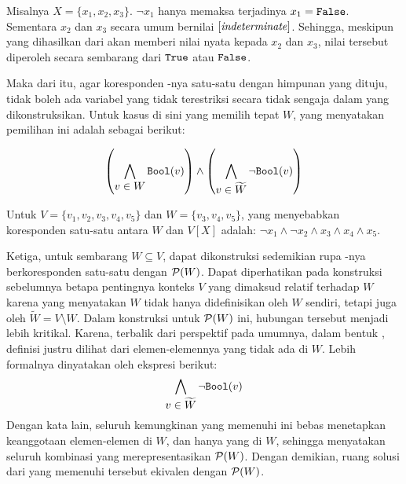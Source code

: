 \begin{example}
	Misalnya \(X = \{x_1, x_2, x_3\}\).  \(\neg x_1\) hanya memaksa terjadinya \(x_1 = \mathtt{False}\). Sementara \(x_2\) dan \(x_3\) secara umum bernilai \(\mathit{[indeterminate]}\). Sehingga, meskipun  yang dihasilkan dari  akan memberi nilai nyata kepada \(x_2\) dan \(x_3\), nilai tersebut diperoleh secara sembarang dari \(\mathtt{True}\) atau \(\mathtt{False}\).
\end{example}

Maka dari itu, agar koresponden -nya satu-satu dengan himpunan yang dituju, tidak boleh ada variabel yang tidak terestriksi secara tidak sengaja dalam  yang dikonstruksikan. Untuk kasus di sini yang memilih tepat \(W\),  yang menyatakan pemilihan ini adalah sebagai berikut:

\[
	\combine{\left(}
			{\bigwedge \limits_{\displaystyle v \in W} \boolmap(v)}
	{\right)}{\wedge}{\left(}
			{\bigwedge \limits_{\displaystyle v \in \widetilde{W}} \neg \boolmap(v)}
	{\right)}
\]

\begin{example}
	Untuk \(V = \{v_1, v_2, v_3, v_4, v_5\}\) dan \(W = \{v_3, v_4, v_5\}\),  yang menyebabkan koresponden satu-satu antara \(W\) dan \(V[X]\) adalah: \(\neg x_1 \wedge \neg x_2 \wedge x_3 \wedge x_4 \wedge x_5\).
\end{example}

Ketiga, untuk sembarang \(W \subseteq V\), dapat dikonstruksi  sedemikian rupa -nya berkoresponden satu-satu dengan \(\mathcal{P}(W)\). Dapat diperhatikan pada konstruksi  sebelumnya betapa pentingnya konteks \(V\) yang dimaksud relatif terhadap \(W\) karena  yang menyatakan \(W\) tidak hanya didefinisikan oleh \(W\) sendiri, tetapi juga oleh \(\widetilde{W} = V \setminus W\). Dalam konstruksi  untuk \(\mathcal{P}(W)\) ini, hubungan tersebut menjadi lebih kritikal. Karena, terbalik dari perspektif  pada umumnya, dalam bentuk , definisi  justru dilihat dari elemen-elemennya yang tidak ada di \(W\). Lebih formalnya dinyatakan oleh ekspresi berikut:
\[
	\bigwedge \limits_{\displaystyle v \in \widetilde{W}} \neg \mathtt{Bool}(v)
\]
Dengan kata lain, seluruh kemungkinan  yang memenuhi  ini bebas menetapkan keanggotaan elemen-elemen di \(W\), dan hanya yang di \(W\), sehingga menyatakan seluruh kombinasi yang merepresentasikan \(\mathcal{P}(W)\). Dengan demikian, ruang solusi dari  yang memenuhi  tersebut ekivalen dengan \(\mathcal{P}(W)\).

